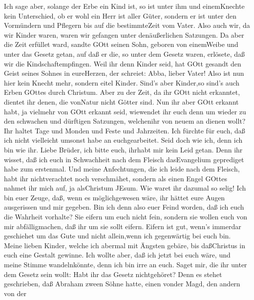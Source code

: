  Ich sage aber, solange der Erbe ein Kind ist, so ist unter
ihm und einemKnechte kein Unterschied, ob er wohl ein Herr ist aller
Güter,  sondern er ist unter den Vormündern und Pflegern bis
auf die bestimmteZeit vom Vater.  Also auch wir, da wir
Kinder waren, waren wir gefangen unter denäußerlichen Satzungen.
 Da aber die Zeit erfüllet ward, sandte GOtt seinen Sohn,
geboren von einemWeibe und unter das Gesetz getan,  auf daß
er die, so unter dem Gesetz waren, erlösete, daß wir die
Kindschaftempfingen.  Weil ihr denn Kinder seid, hat GOtt
gesandt den Geist seines Sohnes in eureHerzen, der schreiet: Abba,
lieber Vater!  Also ist nun hier kein Knecht mehr, sondern
eitel Kinder. Sind's aber Kinder,so sind's auch Erben GOttes durch
Christum.  Aber zu der Zeit, da ihr GOtt nicht erkanntet,
dientet ihr denen, die vonNatur nicht Götter sind.  Nun ihr
aber GOtt erkannt habt, ja vielmehr von GOtt erkannt seid, wiewendet ihr
euch denn um wieder zu den schwachen und dürftigen Satzungen, welchenihr
von neuem an dienen wollt?  Ihr haltet Tage und Monden und
Feste und Jahrzeiten.  Ich fürchte für euch, daß ich nicht
vielleicht umsonst habe an euchgearbeitet.  Seid doch wie
ich, denn ich bin wie ihr. Liebe Brüder, ich bitte euch, ihrhabt mir
kein Leid getan.  Denn ihr wisset, daß ich euch in
Schwachheit nach dem Fleisch dasEvangelium geprediget habe zum
erstenmal.  Und meine Anfechtungen, die ich leide nach dem
Fleisch, habt ihr nichtverachtet noch verschmähet, sondern als einen
Engel GOttes nahmet ihr mich auf, ja alsChristum JEsum. 
Wie waret ihr dazumal so selig! Ich bin euer Zeuge, daß, wenn es
möglichgewesen wäre, ihr hättet eure Augen ausgerissen und mir gegeben.
 Bin ich denn also euer Feind worden, daß ich euch die
Wahrheit vorhalte?  Sie eifern um euch nicht fein, sondern
sie wollen euch von mir abfälligmachen, daß ihr um sie sollt eifern.
 Eifern ist gut, wenn's immerdar geschiehet um das Gute und
nicht allein,wenn ich gegenwärtig bei euch bin.  Meine
lieben Kinder, welche ich abermal mit Ängsten gebäre, bis daßChristus in
euch eine Gestalt gewinne.  Ich wollte aber, daß ich jetzt
bei euch wäre, und meine Stimme wandelnkönnte, denn ich bin irre an
euch.  Saget mir, die ihr unter dem Gesetz sein wollt: Habt
ihr das Gesetz nichtgehöret?  Denn es stehet geschrieben,
daß Abraham zween Söhne hatte, einen vonder Magd, den andern von der
